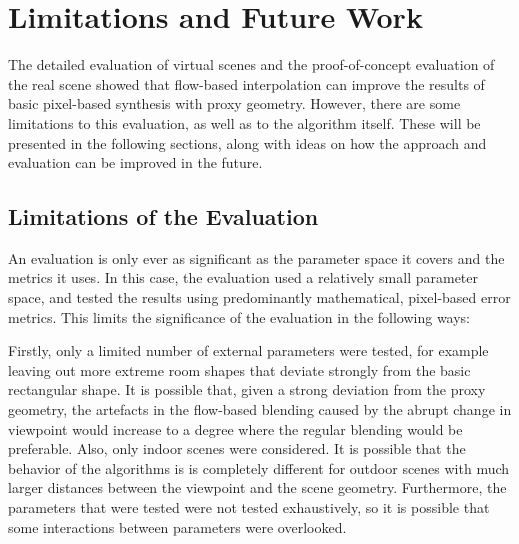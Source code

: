\section{Limitations and Future Work}\label{sec:limitations}
The detailed evaluation of virtual scenes and the proof-of-concept evaluation of the real scene showed that flow-based interpolation can improve the results of basic pixel-based synthesis with proxy geometry. However, there are some limitations to this evaluation, as well as to the algorithm itself. These will be presented in the following sections, along with ideas on how the approach and evaluation can be improved in the future.

\subsection{Limitations of the Evaluation}
An evaluation is only ever as significant as the parameter space it covers and the metrics it uses. In this case, the evaluation used a relatively small parameter space, and tested the results using predominantly mathematical, pixel-based error metrics. This limits the significance of the evaluation in the following ways:

Firstly, only a limited number of external parameters were tested, for example leaving out more extreme room shapes that deviate strongly from the basic rectangular shape. It is possible that, given a strong deviation from the proxy geometry, the artefacts in the flow-based blending caused by the abrupt change in viewpoint would increase to a degree where the regular blending would be preferable. Also, only indoor scenes were considered. It is possible that the behavior of the algorithms is is completely different for outdoor scenes with much larger distances between the viewpoint and the scene geometry. Furthermore, the parameters that were tested were not tested exhaustively, so it is possible that some interactions between parameters were overlooked.

